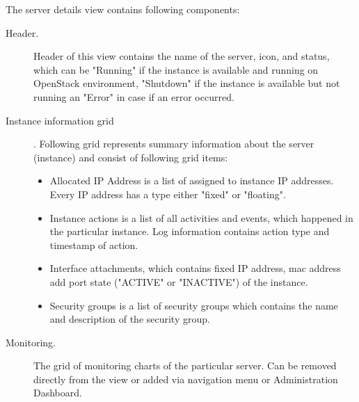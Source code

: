 The server details view contains following components:
\begin{description}
\item[Header.] Header of this view contains the name of the server, icon, and status, which can be "Running" if the instance is available and running on OpenStack environment, "Shutdown" if the instance is available but not running an "Error" in case if an error occurred. 
\item[Instance information grid]. Following grid represents summary information about the server (instance) and consist of following grid items:
\begin{itemize}
\item Allocated IP Address is a list of assigned to instance IP addresses. Every IP address has a type either "fixed" or "floating".
\item Instance actions is a list of all activities and events, which happened in the particular instance. Log information contains action type and timestamp of action.
\item Interface attachments, which contains fixed IP address, mac address add port state ("ACTIVE" or "INACTIVE") of the instance.
\item Security groups is a list of security groups which contains the name and description of the security group. 
\end{itemize}
\item[Monitoring.] The grid of monitoring charts of the particular server. Can be removed directly from the view or added via navigation menu or Administration Dashboard.
\end{description}


